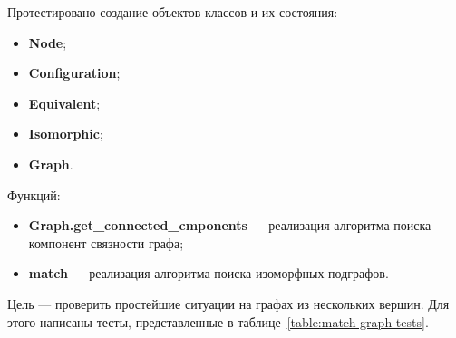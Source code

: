 Протестировано создание объектов классов и их состояния:
\begin{itemize}
\item \textbf{Node};
\item \textbf{Configuration};
\item \textbf{Equivalent};
\item \textbf{Isomorphic};
\item \textbf{Graph}.
\end{itemize}

Функций:
\begin{itemize}
\item \textbf{Graph.get\_connected\_cmponents} --- реализация алгоритма поиска
компонент связности графа;
\item \textbf{match} --- реализация алгоритма поиска изоморфных подграфов.
\end{itemize}

Цель --- проверить простейшие ситуации на графах из нескольких вершин.
Для этого написаны тесты, представленные в таблице~\ref{table:match-graph-tests}.

